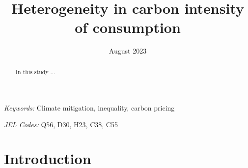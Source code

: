 \documentclass[12pt, a4paper]{article}
\title{Heterogeneity in carbon intensity of consumption}
\date{August 2023}
\begin{document}
\maketitle
\begin{abstract}
  In this study ...
\end{abstract}

\smallskip

\noindent \small \textit{Keywords:} Climate mitigation, inequality, carbon pricing

\noindent \small \textit{JEL Codes:} Q56, D30, H23, C38, C55

\thispagestyle{empty}
\clearpage
\setcounter{page}{1}

\section{Introduction} \label{sec:introduction}
\end{document}
